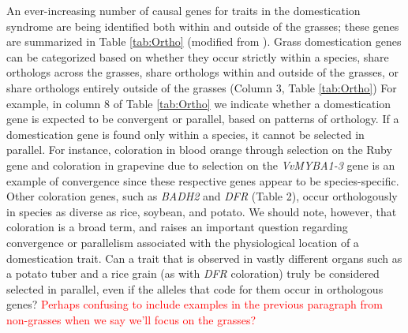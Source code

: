 \documentclass[12pt]{article}
\newcommand{\mbh}[1]{\textcolor{red}{\normalsize  #1}}
\begin{document}
An ever-increasing number of causal genes for traits in the domestication syndrome are being identified both within and outside of the grasses; these genes are summarized in Table \ref{tab:Ortho} (modified from \citep{Lenser2013}).
Grass domestication genes can be categorized based on whether they occur strictly within a species, share orthologs across the grasses, share orthologs within and outside of the grasses, or share orthologs entirely outside of the grasses (Column 3, Table \ref{tab:Ortho})
For example, in column 8 of Table \ref{tab:Ortho} we indicate whether a domestication gene is expected to be convergent or parallel, based on patterns of orthology.
If a domestication gene is found only within a species, it cannot be selected in parallel.
For instance, coloration in blood orange through selection on the Ruby gene and coloration in grapevine due to selection on the \textit{VvMYBA1-3} gene is an example of convergence since these respective genes appear to be species-specific.
Other coloration genes, such as \textit{BADH2} and \textit{DFR} (Table 2), occur orthologously in species as diverse as rice, soybean, and potato.
We should note, however, that coloration is a broad term, and raises an important question regarding convergence or parallelism associated with the physiological location of a domestication trait.
Can a trait that is observed in vastly different organs such as a potato tuber and a rice grain (as with \textit{DFR} coloration) truly be considered selected in parallel, even if the alleles that code for them occur in orthologous genes?
\mbh{Perhaps confusing to include examples in the previous paragraph from non-grasses when we say we'll focus on the grasses?}
\end{document}

